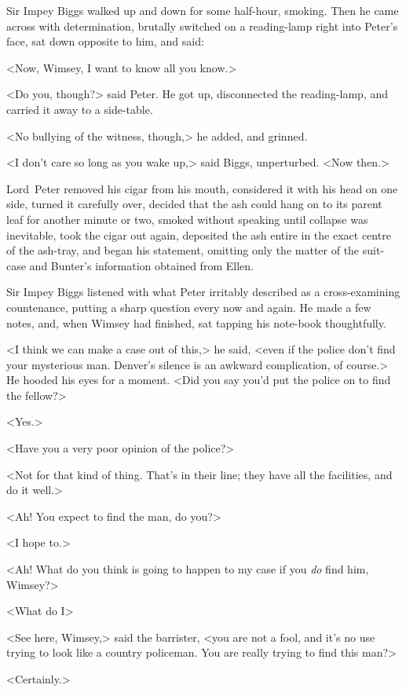 Sir Impey Biggs walked up and down for some half-hour, smoking. Then he came across with determination, brutally switched on a reading-lamp right into Peter's face, sat down opposite to him, and said:

<Now, Wimsey, I want to know all you know.>

<Do you, though?> said Peter. He got up, disconnected the reading-lamp, and carried it away to a side-table.

<No bullying of the witness, though,> he added, and grinned.

<I don't care so long as you wake up,> said Biggs, unperturbed. <Now then.>

Lord~Peter removed his cigar from his mouth, considered it with his head on one side, turned it carefully over, decided that the ash could hang on to its parent leaf for another minute or two, smoked without speaking until collapse was inevitable, took the cigar out again, deposited the ash entire in the exact centre of the ash-tray, and began his statement, omitting only the matter of the suit-case and Bunter's information obtained from Ellen.

Sir Impey Biggs listened with what Peter irritably described as a cross-examining countenance, putting a sharp question every now and again. He made a few notes, and, when Wimsey had finished, sat tapping his note-book thoughtfully.

<I think we can make a case out of this,> he said, <even if the police don't find your mysterious man. Denver's silence is an awkward complication, of course.> He hooded his eyes for a moment. <Did you say you'd put the police on to find the fellow?>

<Yes.>

<Have you a very poor opinion of the police?>

<Not for that kind of thing. That's in their line; they have all the facilities, and do it well.>

<Ah! You expect to find the man, do you?>

<I hope to.>

<Ah! What do you think is going to happen to my case if you \emph{do} find him, Wimsey?>

<What do I\longdash>

<See here, Wimsey,> said the barrister, <you are not a fool, and it's no use trying to look like a country policeman. You are really trying to find this man?>

<Certainly.>

